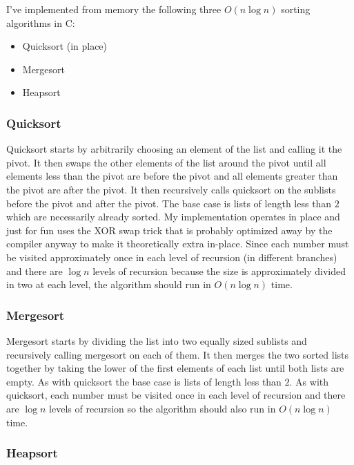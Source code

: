 \documentclass[11pt]{article}
\begin{document}
  \noindent
  I've implemented from memory the following three $O(n \log{n})$
  sorting algorithms in C:
\begin{itemize}
\item Quicksort (in place)
\item Mergesort
\item Heapsort
\end{itemize}
\subsubsection*{Quicksort}
\label{sec-1.1.1}

    Quicksort starts by arbitrarily choosing an element of the list
    and calling it the pivot.  It then swaps the other elements of the
    list around the pivot until all elements less than the pivot are
    before the pivot and all elements greater than the pivot are after
    the pivot.  It then recursively calls quicksort on the sublists
    before the pivot and after the pivot.  The base case is lists of
    length less than $2$ which are necessarily already sorted.  My
    implementation operates in place and just for fun uses the XOR
    swap trick that is probably optimized away by the compiler anyway
    to make it theoretically extra in-place.  Since each number must
    be visited approximately once in each level of recursion (in
    different branches) and there are $\log{n}$ levels of recursion
    because the size is approximately divided in two at each level,
    the algorithm should run in $O(n \log{n})$ time.

\subsubsection*{Mergesort}
\label{sec-1.1.2}

    Mergesort starts by dividing the list into two equally sized
    sublists and recursively calling mergesort on each of them.  It
    then merges the two sorted lists together by taking the lower of
    the first elements of each list until both lists are empty.  As
    with quicksort the base case is lists of length less than $2$.
    As with quicksort,  each number must be visited once in each level
    of recursion and there are $\log{n}$ levels of recursion so the
    algorithm should also run in $O(n \log{n})$ time.
    
\subsubsection*{Heapsort}
\label{sec-1.1.3}
\end{document}
